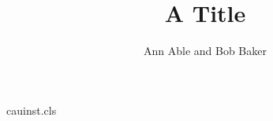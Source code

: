 \begin{filecontents*}[overwrite]{cauinst.cls}
\def\institute#1{\gdef\@institute{\it #1}}
\def\@maketitle{\begin{center}{\LARGE\@title\par}\vskip1em{\large\@author\par}\end{center}
  {\small\begingroup\def\and{\par\noindent}\noindent\@institute\par\endgroup}\vskip1em}
\end{filecontents*}
\documentclass{cauinst}

\title{A Title}
\author{Ann Able and Bob Baker}
\maketitle
Text.

